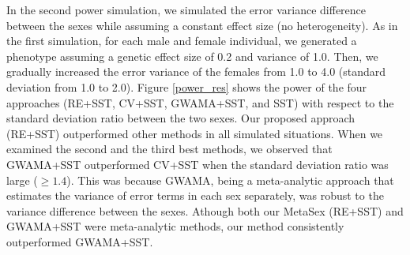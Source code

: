 \documentclass[11pt]{article}
\begin{document}
In the second power simulation, we simulated the error variance difference between the sexes
while assuming a constant effect size (no heterogeneity). 
As in the first simulation, 
for each male and female individual, we generated a phenotype assuming a genetic effect size of 0.2
and variance of 1.0.
Then, we gradually increased the error variance of the females from 1.0 to 4.0 
(standard deviation from 1.0 to 2.0).
Figure \ref{power_res} shows the power of the four approaches 
(RE+SST, CV+SST,
GWAMA+SST, and SST) with respect to 
the standard deviation ratio between the two sexes.
Our proposed approach (RE+SST) outperformed
other methods in all simulated situations. 
When we examined the second and the third best methods,
we observed that GWAMA+SST outperformed CV+SST when the standard deviation ratio was large ($\ge1.4$).
This was because 
GWAMA,
being 
a meta-analytic approach that estimates the variance of error terms in each sex separately,
was robust to the variance difference between the sexes. 
Athough both our MetaSex (RE+SST) and GWAMA+SST were meta-analytic methods,
our method consistently outperformed GWAMA+SST.
 
\end{document}
